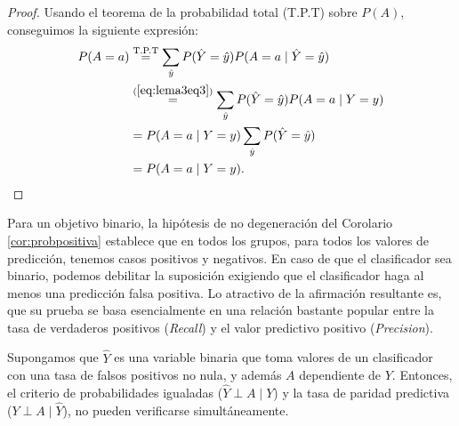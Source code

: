 \documentclass[oneside,openright,titlepage,numbers=noenddot,openany,headinclude,footinclude=true,
cleardoublepage=empty,abstractoff,BCOR=5mm,paper=a4,fontsize=12pt,main=spanish]{scrreprt}
\begin{document}
\begin{proof}
Usando el teorema de la probabilidad total (T.P.T) sobre $P(A)$, conseguimos la siguiente expresión:
\begin{equation*}
\begin{split}
P(A=a)&\overset{\text{T.P.T}}{=}\sum_{\hat{y}}P(\hat{Y}=\hat{y})P(A=a \mid \hat{Y}=\hat{y})\\
&\overset{(\ref{eq:lema3eq3})}{=}\sum_{\hat{y}}P(\hat{Y}=\hat{y})P(A=a \mid Y=y)\\
&=P(A=a \mid Y=y)\sum_{\hat{y}}P(\hat{Y}=\hat{y})\\
&=P(A=a \mid Y=y).
\end{split}
\end{equation*}
\end{proof}

Para un objetivo binario, la hipótesis de no degeneración del Corolario  \ref{cor:probpositiva} establece que en todos los grupos, para todos los valores de predicción, tenemos casos positivos y negativos. En caso de que el clasificador sea binario, podemos debilitar la suposición exigiendo que el clasificador haga al menos una predicción falsa positiva. Lo atractivo de la afirmación resultante es, que su prueba se basa esencialmente en una relación bastante popular entre la tasa de verdaderos positivos (\textit{Recall}) y el valor predictivo positivo (\textit{Precision}).\\

\begin{lemma}
Supongamos que $\hat{Y}$ es una variable binaria que toma valores de un clasificador con una tasa de falsos positivos no nula, y además $A$ dependiente de $Y$. Entonces, el criterio de probabilidades igualadas ($\hat{Y}\perp A \mid Y$) y la tasa de paridad predictiva ($Y\perp A \mid \hat{Y}$), no pueden verificarse simultáneamente.
\label{lem:preigual}
\end{lemma}
\end{document}
